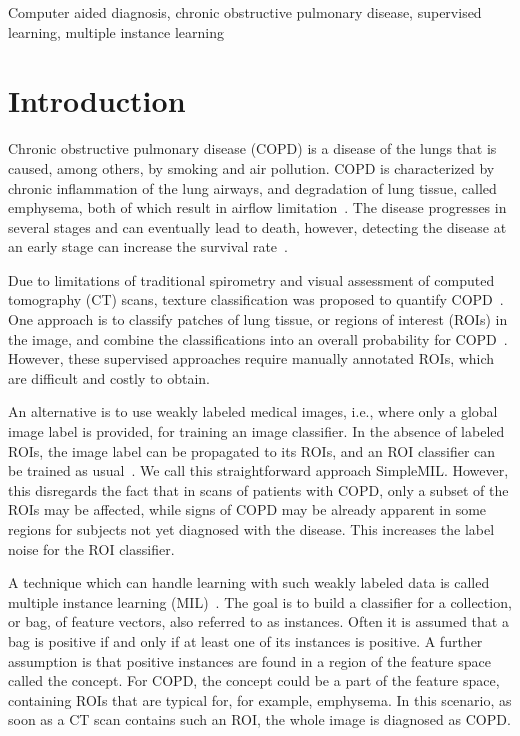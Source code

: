 \documentclass[10pt,conference,a4paper]{IEEEtran}
\begin{document}
\begin{IEEEkeywords}
Computer aided diagnosis, chronic obstructive pulmonary disease, supervised learning, multiple instance learning
\end{IEEEkeywords}







\section{Introduction}\label{sec:intro}


Chronic obstructive pulmonary disease (COPD) is a disease of the lungs that is caused, among others, by smoking and air pollution. COPD is characterized by chronic inflammation of the lung airways, and degradation of lung tissue, called emphysema, both of which result in airflow limitation~\cite{calverley2000copdearly,rabe2007global}. The disease progresses in several stages and can eventually lead to death, however, detecting the disease at an early stage can increase the survival rate~\cite{pauwels2012global}.

Due to limitations of traditional spirometry and visual assessment of computed tomography (CT) scans, texture classification was proposed to quantify COPD~\cite{park2008texture,sorensen2012texture,srensen2010quantitative,uppaluri1997quantification,mendoza2012emphysema}. One approach is to classify patches of lung tissue, or regions of interest (ROIs) in the image, and combine the classifications into an overall probability for COPD~\cite{park2008texture,srensen2010quantitative}. However, these supervised approaches require manually annotated ROIs, which are difficult and costly to obtain.

An alternative is to use weakly labeled medical images, i.e., where only a global image label is provided, for training an image classifier. In the absence of labeled ROIs, the image label can be propagated to its ROIs, and an ROI classifier can be trained as usual~\cite{sorensen2012texture}. We call this straightforward approach SimpleMIL. However, this disregards the fact that in scans of patients with COPD, only a subset of the ROIs may be affected, while signs of COPD may be already apparent in some regions for subjects not yet diagnosed with the disease. This increases the label noise for the ROI classifier.

A technique which can handle learning with such weakly labeled data is called multiple instance learning (MIL)~\cite{dietterich1997solving,maron1998framework}. The goal is to build a classifier for a collection, or bag, of feature vectors, also referred to as instances. Often it is assumed that a bag is positive if and only if at least one of its instances is positive. A further assumption is that positive instances are found in a region of the feature space called the concept. For COPD, the concept could be a part of the feature space, containing ROIs that are typical for, for example, emphysema. In this scenario, as soon as a CT scan contains such an ROI, the whole image is diagnosed as COPD.
\end{document}
